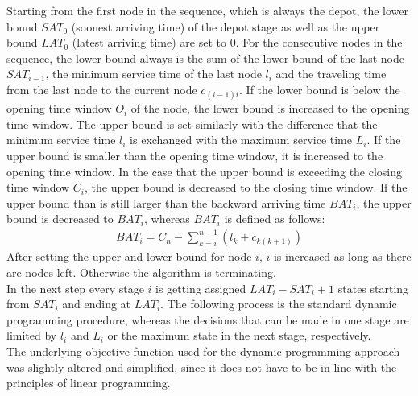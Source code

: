 \documentclass[final,5p,times,twocolumn]{elsarticle}
\begin{document}
{{Starting from the first node in the sequence, which is always the depot, the lower bound $SAT_{0}$ (soonest arriving time) of the depot stage as well as the upper bound $LAT_{0}$ (latest arriving time) are set to 0. For the consecutive nodes in the sequence, the lower bound always is the sum of the lower bound of the last node $SAT_{i-1}$, the minimum service time of the last node $l_{i}$ and the traveling time from the last node to the current node $c_{(i-1)i}$. If the lower bound is below the opening time window $O_{i}$ of the node, the lower bound is increased to the opening time window. The upper bound is set similarly with the difference that the minimum service time $l_{i}$ is exchanged with the maximum service time $L_{i}$. If the upper bound is smaller than the opening time window, it is increased to the opening time window. In the case that the upper bound is exceeding the closing time window $C_{i}$, the upper bound is decreased to the closing time window. If the upper bound than is still larger than the backward arriving time $BAT_{i}$, the upper bound is decreased to $BAT_{i}$, whereas $BAT_{i}$ is defined as follows: 
\begin{align}
BAT_{i}=C_{n}-\sum\limits_{k=i}^{n-1}(l_{k} + c_{k(k+1)})
\end{align}
After setting the upper and lower bound for node $i$, $i$ is increased as long as there are nodes left. Otherwise the algorithm is terminating.\\
In the next step every stage $i$ is getting assigned $LAT_{i}-SAT_{i}+1$ states starting from $SAT_{i}$ and ending at $LAT_{i}$. The following process is the standard dynamic programming procedure, whereas the decisions that can be made in one stage are limited by $l_{i}$ and $L_{i}$ or the maximum state in the next stage, respectively.\\
The underlying objective function used for the dynamic programming approach was slightly altered and simplified, since it does not have to be in line with the principles of linear programming. 

\begin{figure}[htbp]
\centering
{}
\end{figure}}}
\end{document}

